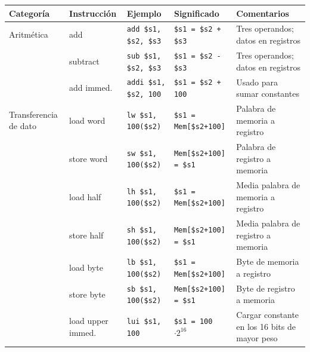 \documentclass[12pt,a4paper]{article}
\begin{document}
	\begin{table}[H] 
		\centering
		\small
		\begin{tabularx}{\textwidth}{>{\raggedright\arraybackslash}p{2.2cm} >{\raggedright\arraybackslash}p{2.2cm} >{\raggedright\arraybackslash}p{3cm} >{\raggedright\arraybackslash}p{3.5cm} X}
			\toprule
			\textbf{Categoría} & \textbf{Instrucción} & \textbf{Ejemplo} & \textbf{Significado} & \textbf{Comentarios} \\
			\midrule
			Aritmética 
			& add & \texttt{add \$s1, \$s2, \$s3} & \texttt{\$s1 = \$s2 + \$s3} & Tres operandos; datos en registros \\
			& subtract & \texttt{sub \$s1, \$s2, \$s3} & \texttt{\$s1 = \$s2 - \$s3} & Tres operandos; datos en registros \\
			& add immed. & \texttt{addi \$s1, \$s2, 100} & \texttt{\$s1 = \$s2 + 100} & Usado para sumar constantes \\
			\midrule
			Transferencia de dato 
			& load word & \texttt{lw \$s1, 100(\$s2)} & \texttt{\$s1 = Mem[\$s2+100]} & Palabra de memoria a registro \\
			& store word & \texttt{sw \$s1, 100(\$s2)} & \texttt{Mem[\$s2+100] = \$s1} & Palabra de registro a memoria \\
			& load half & \texttt{lh \$s1, 100(\$s2)} & \texttt{\$s1 = Mem[\$s2+100]} & Media palabra de memoria a registro \\
			& store half & \texttt{sh \$s1, 100(\$s2)} & \texttt{Mem[\$s2+100] = \$s1} & Media palabra de registro a memoria \\
			& load byte & \texttt{lb \$s1, 100(\$s2)} & \texttt{\$s1 = Mem[\$s2+100]} & Byte de memoria a registro \\
			& store byte & \texttt{sb \$s1, 100(\$s2)} & \texttt{Mem[\$s2+100] = \$s1} & Byte de registro a memoria \\
			& load upper immed. & \texttt{lui \$s1, 100} & \texttt{\$s1 = 100 $\cdot 2^{16}$} & Cargar constante en los 16 bits de mayor peso \\
			\bottomrule
		\end{tabularx}
		
	\end{table}
	
\end{document}
